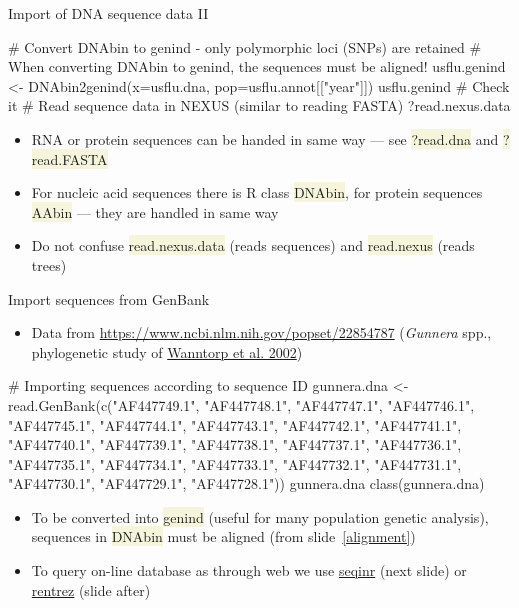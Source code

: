 \documentclass[compress, xelatex, 11pt, xcolor=svgnames, aspectratio=169,
	hyperref={
		bookmarks=true,
		unicode=true,
		colorlinks=true,
		pdftitle={Molecular data in R},
		plainpages=false,
		pdfauthor={Vojtech Zeisek},
		pdfsubject={Course about phylogeny and evolution in R},
		pdfcreator={XeLaTeX},
		pdfkeywords={R, evolution, phylogeny, molecular data},
		linkcolor=Crimson, %
		anchorcolor=Magenta, %
		citecolor=Magenta, %
		filecolor=Magenta, %
		menucolor=Magenta, %
		urlcolor=DodgerBlue, %
		},
	url={hyphens, lowtilde} %
	]{beamer}
\renewcommand{\texttt}[1]{\colorbox{Beige}{{\ttfamily #1}}}
\begin{document}
\begin{frame}[fragile]{Import of DNA sequence data II}
	\begin{spluscode}
    # Convert DNAbin to genind - only polymorphic loci (SNPs) are retained
    # When converting DNAbin to genind, the sequences must be aligned!
    usflu.genind <- DNAbin2genind(x=usflu.dna, pop=usflu.annot[["year"]])
    usflu.genind # Check it
    # Read sequence data in NEXUS (similar to reading FASTA)
    ?read.nexus.data
	\end{spluscode}
	\begin{itemize}
		\item RNA or protein sequences can be handed in same way --- see \texttt{?read.dna} and \texttt{?read.FASTA}
		\item For nucleic acid sequences there is R class \texttt{DNAbin}, for protein sequences \texttt{AAbin} --- they are handled in same way
		\item Do not confuse \texttt{read.nexus.data} (reads sequences) and \texttt{read.nexus} (reads trees)
	\end{itemize}
\end{frame}

\begin{frame}[fragile]{Import sequences from GenBank}
	\begin{itemize}
		\item Data from \url{https://www.ncbi.nlm.nih.gov/popset/22854787} (\textit{Gunnera} spp., phylogenetic study of \href{https://bioone.org/journals/systematic-botany/volume-27/issue-3/0363-6445-27.3.512/Phylogenetic-Relationships-of-Gunnera-based-on-Nuclear-Ribosomal-DNA-ITS/10.1043/0363-6445-27.3.512.full}{Wanntorp et al. 2002})
	\end{itemize}
	\begin{spluscode}
    # Importing sequences according to sequence ID
    gunnera.dna <- read.GenBank(c("AF447749.1", "AF447748.1", "AF447747.1",
      "AF447746.1", "AF447745.1", "AF447744.1", "AF447743.1", "AF447742.1",
      "AF447741.1", "AF447740.1", "AF447739.1", "AF447738.1", "AF447737.1",
      "AF447736.1", "AF447735.1", "AF447734.1", "AF447733.1", "AF447732.1",
      "AF447731.1", "AF447730.1", "AF447729.1", "AF447728.1"))
    gunnera.dna
    class(gunnera.dna)
	\end{spluscode}
	\begin{itemize}
		\item To be converted into \texttt{genind} (useful for many population genetic analysis), sequences in \texttt{DNAbin} must be aligned (from slide~\ref{alignment})
		\item To query on-line database as through web we use \href{https://CRAN.R-project.org/package=seqinr}{seqinr} (next slide) or \href{https://CRAN.R-project.org/package=rentrez}{rentrez} (slide after)
	\end{itemize}
\end{frame}
\end{document}
